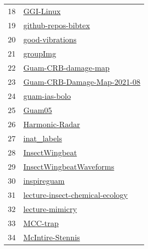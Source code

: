 \begin{longtable}{rl}
18 &                                                     \href{https://github.com/aubreymoore/GGI-Linux}{GGI-Linux} \\
19 &                                 \href{https://github.com/aubreymoore/github-repos-bibtex}{github-repos-bibtex} \\
20 &                                         \href{https://github.com/aubreymoore/good-vibrations}{good-vibrations} \\
21 &                                                       \href{https://github.com/aubreymoore/groupImg}{groupImg} \\
22 &                                 \href{https://github.com/aubreymoore/Guam-CRB-damage-map}{Guam-CRB-damage-map} \\
23 &                 \href{https://github.com/aubreymoore/Guam-CRB-Damage-Map-2021-08}{Guam-CRB-Damage-Map-2021-08} \\
24 &                                             \href{https://github.com/aubreymoore/guam-ias-bolo}{guam-ias-bolo} \\
25 &                                                           \href{https://github.com/aubreymoore/Guam05}{Guam05} \\
26 &                                           \href{https://github.com/aubreymoore/Harmonic-Radar}{Harmonic-Radar} \\
27 &                                                 \href{https://github.com/aubreymoore/inat_labels}{inat_labels} \\
28 &                                           \href{https://github.com/aubreymoore/InsectWingbeat}{InsectWingbeat} \\
29 &                         \href{https://github.com/aubreymoore/InsectWingbeatWaveforms}{InsectWingbeatWaveforms} \\
30 &                                                 \href{https://github.com/aubreymoore/inspireguam}{inspireguam} \\
31 &         \href{https://github.com/aubreymoore/lecture-insect-chemical-ecology}{lecture-insect-chemical-ecology} \\
32 &                                         \href{https://github.com/aubreymoore/lecture-mimicry}{lecture-mimicry} \\
33 &                                                       \href{https://github.com/aubreymoore/MCC-trap}{MCC-trap} \\
34 &                                       \href{https://github.com/aubreymoore/McIntire-Stennis}{McIntire-Stennis} \\

\end{longtable}
